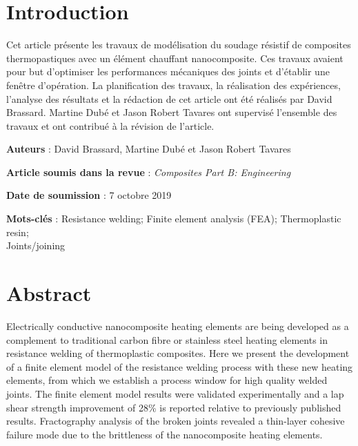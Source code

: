 \label{sec:Theme2}

\section{Introduction}

Cet article présente les travaux de modélisation du soudage résistif de composites thermopastiques avec un élément chauffant nanocomposite. Ces travaux avaient pour but d'optimiser les performances mécaniques des joints et d'établir une fenêtre d'opération. La planification des travaux, la réalisation des expériences, l'analyse des résultats et la rédaction de cet article ont été réalisés par David Brassard. Martine Dubé et Jason Robert Tavares ont supervisé l'ensemble des travaux et ont contribué à la révision de l'article. 

\textbf{Auteurs} : David Brassard, Martine Dubé et Jason Robert Tavares

\textbf{Article soumis dans la revue} : \textit{Composites Part B: Engineering}

\textbf{Date de soumission} : 7 octobre 2019

\textbf{Mots-clés} : Resistance welding; Finite element analysis (FEA); Thermoplastic resin; \\ Joints/joining


\section{Abstract}

Electrically conductive nanocomposite heating elements are being developed as a complement to traditional carbon fibre or stainless steel heating elements in resistance welding of thermoplastic composites. 
Here we present the development of a finite element model of the resistance welding process with these new heating elements, from which we establish a process window for high quality welded joints. 
The finite element model results were validated experimentally and a lap shear strength improvement of 28\% is reported relative to previously published results. 
Fractography analysis of the broken joints revealed a thin-layer cohesive failure mode due to the brittleness of the nanocomposite heating elements. 

